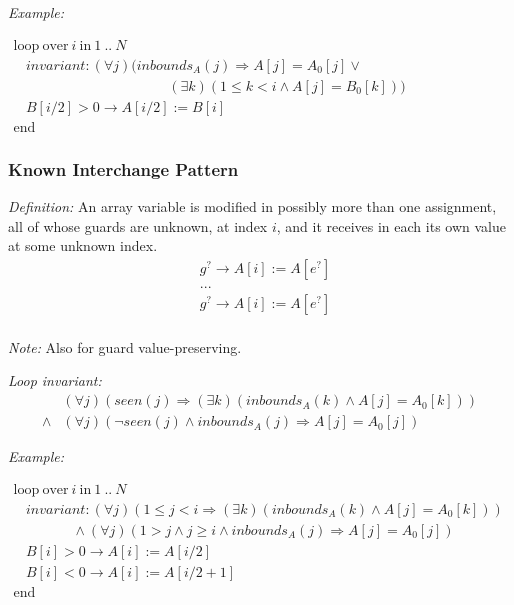 \documentclass[a4paper,10pt]{article}
\newcommand{\idx}{\ensuremath{i}\xspace}
\newcommand{\KWloop}{\ensuremath{\mathrm{loop}~}}
\newcommand{\KWend}{\ensuremath{\mathrm{end}~}}
\newcommand{\KWover}{\ensuremath{\mathrm{over}~}}
\newcommand{\KWin}{\ensuremath{~\mathrm{in}~}}
\newcommand{\impl}{\ensuremath{\Longrightarrow}}
\newcommand{\inbounds}[2]{\ensuremath{\mathit{inbounds}_{#1}(#2)}\xspace}
\newcommand{\seen}[1]{\ensuremath{\mathit{seen}(#1)}\xspace}
\newcommand{\loopinvariant}{\noindent\textit{Loop invariant:}\xspace}
\newcommand{\patterndef}{\noindent\textit{Definition:}\xspace}
\newcommand{\patternexample}{\noindent\textit{Example:}\xspace}
\newcommand{\patternnote}{\noindent\textit{Note:}\xspace}
\begin{document}
\bigskip
\patternexample

\medskip
$\begin{array}{l}
  \KWloop \KWover i \KWin 1~..~N \\
  ~~~~ \textit{invariant}: (\forall j)(\inbounds{A}{j} \impl A[j] = A_0[j] \lor \\
  ~~~~~~~~~~~~~~~~~~~~~~~~~~~~~~~~~~~~~~~~~~~~~~~~~~ (\exists k)(1 \leq k < i \land A[j] = B_0[k]))\\
  ~~~~ B[i/2] > 0 \rightarrow A[i/2] := B[i]\\
  \KWend
\end{array}$

\subsubsection*{Known Interchange Pattern}

\patterndef An array variable is modified in possibly more than one assignment,
all of whose guards are unknown, at index \idx, and it receives in each
its own value at some unknown index.
%
\begin{eqnarray*}
&g^? \rightarrow A[\idx] := A[e^?]\\
&...\\
&g^? \rightarrow A[\idx] := A[e^?]\\
\end{eqnarray*}

\patternnote Also for guard value-preserving.

\medskip
\loopinvariant
%
\begin{eqnarray*}
&(\forall j)(\seen{j} \impl (\exists k)(\inbounds{A}{k} \land A[j] = A_0[k])) \\
\land&
(\forall j)(\neg \seen{j} \land \inbounds{A}{j} \impl A[j] = A_0[j])
\end{eqnarray*}

\bigskip
\patternexample

\medskip
$\begin{array}{l}
  \KWloop \KWover i \KWin 1~..~N \\
  ~~~~ \textit{invariant}: (\forall j)(1 \leq j < i \impl (\exists k)(\inbounds{A}{k} \land A[j] = A_0[k]))\\
  ~~~~~~~~~~~~~~~~~~~ \land (\forall j)(1 > j \land j \geq i \land \inbounds{A}{j} \impl A[j] = A_0[j])\\
  ~~~~ B[i] > 0 \rightarrow A[i] := A[i/2]\\
  ~~~~ B[i] < 0 \rightarrow A[i] := A[i/2+1]\\
  \KWend
\end{array}$
\end{document}
